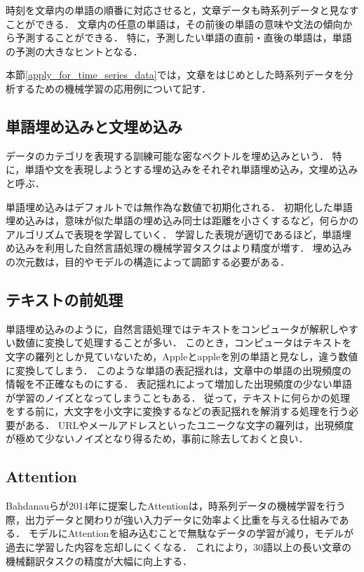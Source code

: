 \documentclass[12pt,a4j,dvipdfmx]{jreport}
\begin{document}
時刻を文章内の単語の順番に対応させると，文章データも時系列データと見なすことができる．
文章内の任意の単語は，その前後の単語の意味や文法の傾向から予測することができる．
特に，予測したい単語の直前・直後の単語は，単語の予測の大きなヒントとなる．

本節\ref{apply_for_time_series_data}では，文章をはじめとした時系列データを分析するための機械学習の応用例について記す．

\subsection{単語埋め込みと文埋め込み}
データのカテゴリを表現する訓練可能な密なベクトルを埋め込みという\cite{aurellen20}．
特に，単語や文を表現しようとする埋め込みをそれぞれ単語埋め込み，文埋め込みと呼ぶ．

単語埋め込みはデフォルトでは無作為な数値で初期化される．
初期化した単語埋め込みは，意味が似た単語の埋め込み同士は距離を小さくするなど，何らかのアルゴリズムで表現を学習していく．
学習した表現が適切であるほど，単語埋め込みを利用した自然言語処理の機械学習タスクはより精度が増す．
埋め込みの次元数は，目的やモデルの構造によって調節する必要がある．

\subsection{テキストの前処理}
\label{subsection_texts_preprocessing}
単語埋め込みのように，自然言語処理ではテキストをコンピュータが解釈しやすい数値に変換して処理することが多い．
このとき，コンピュータはテキストを文字の羅列としか見ていないため，Appleとappleを別の単語と見なし，違う数値に変換してしまう．
このような単語の表記揺れは，文章中の単語の出現頻度の情報を不正確なものにする．
表記揺れによって増加した出現頻度の少ない単語が学習のノイズとなってしまうこともある．
従って，テキストに何らかの処理をする前に，大文字を小文字に変換するなどの表記揺れを解消する処理を行う必要がある．
URLやメールアドレスといったユニークな文字の羅列は，出現頻度が極めて少ないノイズとなり得るため，事前に除去しておくと良い．


\subsection{Attention}
Bahdanauらが2014年に提案したAttentionは，時系列データの機械学習を行う際，出力データと関わりが強い入力データに効率よく比重を与える仕組みである\cite{aurellen20}\cite{bahdanau_neural_2016}．
モデルにAttentionを組み込むことで無駄なデータの学習が減り，モデルが過去に学習した内容を忘却しにくくなる．
これにより，30語以上の長い文章の機械翻訳タスクの精度が大幅に向上する．
\end{document}
